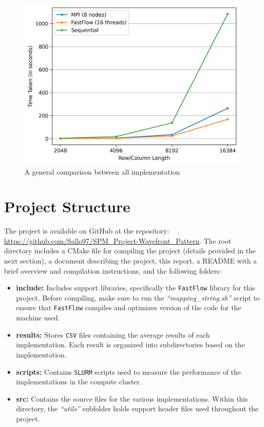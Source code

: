 \begin{figure}[h!]
\begin{minipage}[t]{0.49\textwidth}
    \end{minipage}
    \begin{minipage}[t]{0.90\textwidth}
        \centering
        \includegraphics[width=\textwidth]{img/MPI/general_comparison.png}
        \caption{A general comparison between all implementation}
        \label{FF_Chunk}
    \end{minipage}
\end{figure}

\section*{Project Structure}
The project is available on GitHub at the repository: \href{https://github.com/Sallo97/SPM_Project-Wavefront_Pattern}{https://github.com/Sallo97/SPM\_Project-Wavefront\_Pattern}. The root directory includes a CMake file for compiling the project (details provided in the next section), a document describing the project, this report, a README with a brief overview and compilation instructions, and the following folders:

\begin{itemize} 
    \item \textbf{include:} Includes support libraries, specifically the \texttt{FastFlow} library for this project. Before compiling, make sure to run the \textit{``mapping\_string.sh''} script to ensure that \texttt{FastFlow} compiles and optimizes version of the code for the machine used.

    \item \textbf{results:} Stores \texttt{CSV} files containing the average results of each implementation. Each result is organized into subdirectories based on the implementation.

    \item \textbf{scripts:} Contains \texttt{SLURM} scripts used to measure the performance of the implementations in the compute cluster.

    \item \textbf{src:} Contains the source files for the various implementations. Within this directory, the \textit{``utils''} subfolder holds support header files used throughout the project.
\end{itemize}



